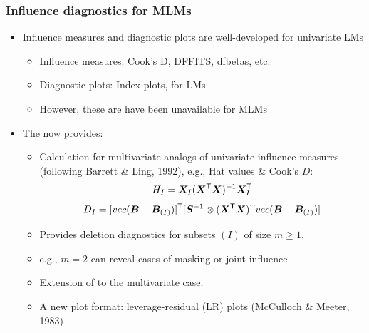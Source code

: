 \begin{frame}
  \frametitle{Influence diagnostics for MLMs}

  \begin{itemize}
  \item<1-> Influence measures and diagnostic plots are well-developed for univariate LMs
    \begin{itemize}
    \item Influence measures: Cook's D, DFFITS, dfbetas, etc.
    \item Diagnostic plots:  Index plots,  for LMs
    \item However, these are have been unavailable for MLMs  
    \end{itemize}
  \item<2->
    The  now provides:
    \begin{itemize}
    \item Calculation for multivariate analogs of univariate influence measures
    (following Barrett \& Ling, 1992), e.g., Hat values \& Cook's $D$:
    \begin{equation}
    	H_I = \bm{X}_I
    	      (\bm{X}^\mathsf{T}\bm{X})^{-1}
    	      \bm{X}_I^\mathsf{T}
    \end{equation}
    \begin{equation}
    	D_I = [vec(\bm{B} - \bm{B}_{(I)})]^\mathsf{T}
    	      [\bm{S}^{-1} \otimes (\bm{X}^\mathsf{T}\bm{X})]
    	      [vec(\bm{B} - \bm{B}_{(I)})]
    \end{equation}
    \item Provides deletion diagnostics for subsets $(I)$ of size $m \ge 1$.
    \item e.g., $m=2$ can reveal cases of \alert{masking} or \alert{joint influence}.
    \item Extension of  to the multivariate case.
    \item A new plot format: \alert{leverage-residual (LR) plots} (McCulloch \& Meeter, 1983)
    \end{itemize}
  \end{itemize}
\end{frame}

